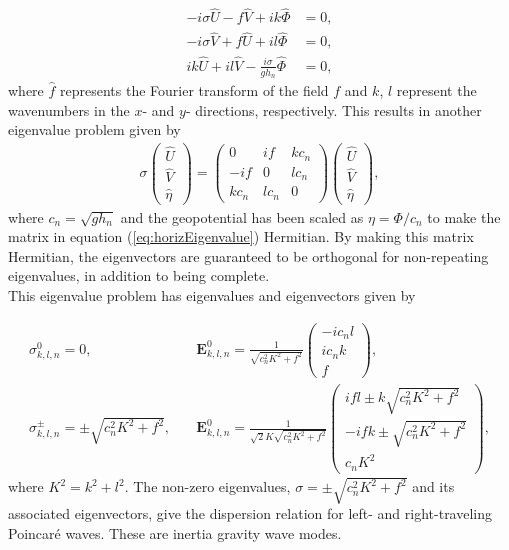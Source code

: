 \begin{align}
-i\sigma \widehat{U} - f\widehat{V} + ik\widehat{\Phi} &= 0, \label{eq:shallowBegin}\\
-i\sigma \widehat{V} + f\widehat{U} + il\widehat{\Phi} &= 0,\\
ik\widehat{U} + il\widehat{V} - \frac{i\sigma}{gh_n} \widehat{\Phi} &= 0, \label{eq:shallowEnd}
\end{align}
where $\widehat{f}$ represents the Fourier transform of the field $f$ and $k$, $l$ represent the wavenumbers in the $x$- and $y$- directions, respectively. This results in another eigenvalue problem given by
\begin{align}
\sigma \left(\begin{array}{c}
\widehat{U}\\
\widehat{V}\\
\widehat{\eta}
\end{array}\right)=\left(\begin{array}{ccc}
0 & if & kc_n\\
-if & 0 & lc_n\\
kc_n & lc_n & 0
\end{array}\right)
\left(\begin{array}{c}
\widehat{U}\\
\widehat{V}\\
\widehat{\eta}
\end{array}\right) ,\label{eq:horizEigenvalue}
\end{align}
where $c_n = \sqrt{gh_n}$ and the geopotential has been scaled as $\eta = \Phi/c_n$ to make the matrix in equation (\ref{eq:horizEigenvalue}) Hermitian. By making this matrix Hermitian, the eigenvectors are guaranteed to be orthogonal for non-repeating eigenvalues, in addition to being complete.\\

This eigenvalue problem has eigenvalues and eigenvectors given by

\begin{align}
\sigma^0_{k,l,n} = 0, \quad &\mathbf{E}^0_{k,l,n} = \frac{1}{\sqrt{c^2_n K^2 + f^2}} \left(\begin{array}{c}
-ic_nl\\
ic_nk\\
f\end{array}\right),\label{eq:geo}\\[2ex]
\sigma^\pm_{k,l,n} = \pm \sqrt{c^2_nK^2 + f^2}, \quad &\mathbf{E}^0_{k,l,n} = \frac{1}{\sqrt{2}K\sqrt{c^2_n K^2 + f^2}} \left(\begin{array}{c}
ifl \pm k\sqrt{c^2_n K^2 + f^2}\\
-ifk \pm \sqrt{c^2_n K^2 + f^2}\\
c_nK^2\end{array}\right),\label{eq:ageo}
\end{align}
where $K^2 = k^2 + l^2$. The non-zero eigenvalues, $\sigma = \pm \sqrt{c^2_nK^2 + f^2}$ and its associated eigenvectors, give the dispersion relation for left- and right-traveling Poincar\'e waves. These are inertia gravity wave modes. 

